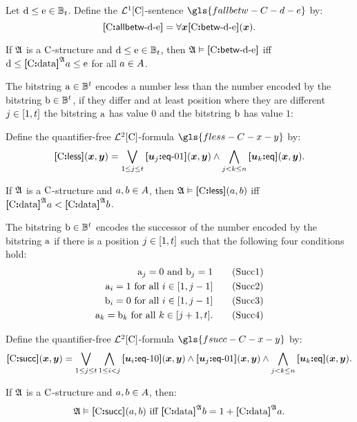 \begin{definition}
Let $\mathrm{d} \leq \mathrm{e} \in \mathbb{B}_{t}$.
Define the $\mathcal{L}^{1}[\mathrm{C}]$-sentence $\gls{fallbetw-C-d-e}$ by:
\[
  {\bm{[}\mathrm{C}\mathord{\bm{:}}\mathsf{allbetw}{\hbox{-}}\mathrm{d}{\hbox{-}}\mathrm{e}\bm{]}} = \forall\bm{x}{\bm{[}\mathrm{C}\mathord{\bm{:}}\mathsf{betw}{\hbox{-}}\mathrm{d}{\hbox{-}}\mathrm{e}\bm{]}}(\bm{x}).
\]
\end{definition}
If $\mathfrak{A}$ is a $\mathrm{C}$-structure and $\mathrm{d} \leq \mathrm{e} \in \mathbb{B}_{t}$,
then $\mathfrak{A} \vDash {\bm{[}\mathrm{C}\mathord{\bm{:}}\mathsf{betw}{\hbox{-}}\mathrm{d}{\hbox{-}}\mathrm{e}\bm{]}}$ iff
$\mathrm{d} \leq {\bm{[}\mathrm{C}\mathord{\bm{:}}\mathrm{data}\bm{]}}^{\mathfrak{A}}a \leq \mathrm{e}$ for all $a \in A$.

The bitstring $\mathrm{a} \in \mathbb{B}^{t}$ encodes a number less than the
number encoded by the bitstring $\mathrm{b} \in \mathbb{B}^{t}$, if they differ
and at least position where they are different $j \in [1,t]$ the bitstring
$\mathrm{a}$ has value $0$ and the bitstring $\mathrm{b}$ has value $1$:
\begin{definition}
Define the quantifier-free $\mathcal{L}^{2}[\mathrm{C}]$-formula $\gls{fless-C-x-y}$ by:
\[
  {\bm{[}\mathrm{C}\mathord{\bm{:}}\mathsf{less}\bm{]}}(\bm{x},\bm{y}) = \bigvee_{1 \leq j \leq t} {\bm{[}\bm{u}_{j}\mathord{\bm{:}}\mathsf{eq}{\hbox{-}}01\bm{]}}(\bm{x},\bm{y})
  \land \bigwedge_{j < k \leq n} {\bm{[}\bm{u}_{k}\mathord{\bm{:}}\mathsf{eq}\bm{]}}(\bm{x},\bm{y}).
\]
\end{definition}
If $\mathfrak{A}$ is a $\mathrm{C}$-structure and $a, b \in A$,
then $\mathfrak{A} \vDash {\bm{[}\mathrm{C}\mathord{\bm{:}}\mathsf{less}\bm{]}}(a, b)$ iff
${\bm{[}\mathrm{C}\mathord{\bm{:}}\mathrm{data}\bm{]}}^{\mathfrak{A}}a < {\bm{[}\mathrm{C}\mathord{\bm{:}}\mathrm{data}\bm{]}}^{\mathfrak{A}}b$.

The bitstring $\mathrm{b} \in \mathbb{B}^{t}$ encodes the successor of the number
encoded by the bitstring $\mathrm{a}$ if there is a position $j \in [1,t]$
such that the following four conditions hold:
\begin{align}
  \mathrm{a}_j = 0 \text{ and } \mathrm{b}_j = 1 \tag{Succ1}\label{Succ1} \\
  \mathrm{a}_i = 1 \text{ for all } i \in [1,j-1] \tag{Succ2}\label{Succ2} \\
  \mathrm{b}_i = 0 \text{ for all } i \in [1,j-1] \tag{Succ3}\label{Succ3} \\
  \mathrm{a}_k = \mathrm{b}_k \text{ for all } k \in [j+1, t].
  \tag{Succ4}\label{Succ4}
\end{align}
\begin{definition}
Define the quantifier-free $\mathcal{L}^{2}[\mathrm{C}]$-formula $\gls{fsucc-C-x-y}$ by:
\[
  {\bm{[}\mathrm{C}\mathord{\bm{:}}\mathsf{succ}\bm{]}}(\bm{x},\bm{y}) = \bigvee_{1 \leq j \leq t}
  \bigwedge_{1 \leq i < j} 
  {\bm{[}\bm{u}_{i}\mathord{\bm{:}}\mathsf{eq}{\hbox{-}}10\bm{]}}(\bm{x},\bm{y}) \land
  {\bm{[}\bm{u}_{j}\mathord{\bm{:}}\mathsf{eq}{\hbox{-}}01\bm{]}}(\bm{x},\bm{y}) \land 
  \bigwedge_{j < k \leq n} {\bm{[}\bm{u}_{k}\mathord{\bm{:}}\mathsf{eq}\bm{]}}(\bm{x},\bm{y}).
\]
\end{definition}
If $\mathfrak{A}$ is a $\mathrm{C}$-structure and $a, b \in A$,
then:
\[
  \miff{
  \StrA \vDash \fsucc\CS(\ea, \eb)}{
  \data\CS\StrA\eb = 1 + \data\CS\StrA\ea}.
\]